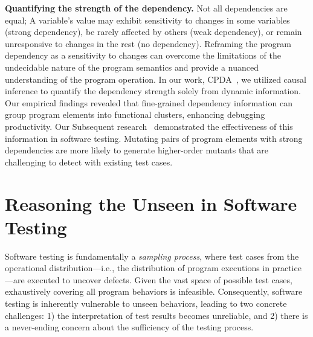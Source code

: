 \documentclass{article}
\begin{document}
\vspace{0.5em}
\noindent\textbf{Quantifying the strength of the dependency.}
Not all dependencies are equal; A variable's value may exhibit sensitivity to changes in some variables (strong dependency), be rarely affected by others (weak dependency), or remain unresponsive to changes in the rest (no dependency). Reframing the program dependency as a sensitivity to changes can overcome the limitations of the undecidable nature of the program semantics and provide a nuanced understanding of the program operation. In our work, CPDA~\cite{leeCausalProgramDependence2025a}, we utilized causal inference to quantify the dependency strength solely from dynamic information. Our empirical findings revealed that fine-grained dependency information can group program elements into functional clusters, enhancing debugging productivity. Our Subsequent research~\cite{ohEffectivelySamplingHigher2021} demonstrated the effectiveness of this information in software testing. Mutating pairs of program elements with strong dependencies are more likely to generate higher-order mutants that are challenging to detect with existing test cases.


\section{Reasoning the Unseen in Software Testing}
\label{sec:unseen}

Software testing is fundamentally a \emph{sampling process}, where test cases from the operational distribution—i.e., the distribution of program executions in practice—are executed to uncover defects. Given the vast space of possible test cases, exhaustively covering all program behaviors is infeasible. Consequently, software testing is inherently vulnerable to unseen behaviors, leading to two concrete challenges: 1) the interpretation of test results becomes unreliable, and 2) there is a never-ending concern about the sufficiency of the testing process.
\end{document}
